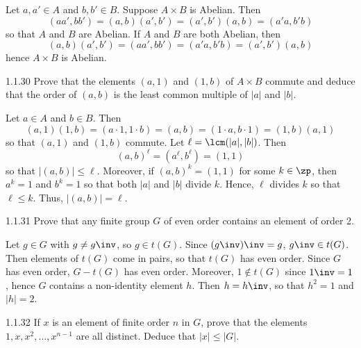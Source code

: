 \begin{sol}
    Let $a, a' \in A$ and $b, b' \in B$.
	Suppose $A \times B$ is Abelian.
	Then
    \[
    	(aa', bb') = (a, b)(a', b') = (a', b')(a, b) = (a'a, b'b)
    \]
    so that $A$ and $B$ are Abelian.
	If $A$ and $B$ are both Abelian, then
    \[
    	(a, b)(a', b') = (aa', bb') = (a'a, b'b) = (a', b')(a, b)
    \]
    hence $A \times B$ is Abelian.
\end{sol}

\begin{exercise}{1.1.30}
    Prove that the elements $(a, 1)$ and $(1, b)$ of $A \times B$ commute and deduce that the order of $(a, b)$ is the least common multiple of $|a|$ and $|b|$.
\end{exercise}

\begin{sol}
    Let $a \in A$ and $b \in B$.
	Then
    \[
    	(a, 1)(1, b) = (a \cdot 1, 1 \cdot b) = (a, b) = (1 \cdot a, b \cdot 1) = (1, b)(a, 1)
    \]
    so that $(a, 1)$ and $(1, b)$ commute.
	Let $\ell = \lcm(|a|, |b|)$.
	Then
    \[
    	(a, b)^{\ell} = (a^{\ell}, b^{\ell}) = (1, 1)
    \]
    so that $|(a, b)| \leq \ell$.
	Moreover, if $(a, b)^k = (1, 1)$ for some $k \in \zp$, then $a^k = 1$ and $b^k = 1$ so that both $|a|$ and $|b|$ divide $k$.
	Hence, $\ell$ divides $k$ so that $\ell \leq k$.
	Thus, $|(a, b)| = \ell$.
\end{sol}

\begin{exercise}{1.1.31}
    Prove that any finite group $G$ of even order contains an element of order 2. 
    
\end{exercise}

\begin{sol}
    Let $g \in G$ with $g \neq g\inv$, so $g \in t(G)$.
	Since $(g\inv)\inv = g$, $g\inv \in t(G)$.
	Then elements of $t(G)$ come in pairs, so that $t(G)$ has even order.
	Since $G$ has even order, $G - t(G)$ has even order.
	Moreover, $1 \notin t(G)$ since $1\inv = 1$, hence $G$ contains a non-identity element $h$.
	Then $h = h\inv$, so that $h^2 = 1$ and $|h| = 2$.
\end{sol}

\begin{exercise}{1.1.32}
    If $x$ is an element of finite order $n$ in $G$, prove that the elements $1, x, x^2, \dots, x^{n-1}$ are all distinct.
	Deduce that $|x| \leq |G|$.
\end{exercise}


